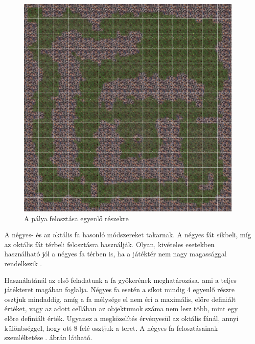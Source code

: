 \begin{figure}[h]
\centering
\includegraphics[scale=0.3]{kepek/grid.png}
\caption{A pálya felosztása egyenlő részekre}
\label{fig:grid}
\end{figure}


A négyes- és az oktális fa hasonló módszereket takarnak. A négyes fát síkbeli, míg az oktális fát térbeli felosztásra használják. Olyan, kivételes esetekben használható jól a négyes fa térben is, ha a játéktér nem nagy magassággal rendelkezik \cite{quadtree}.

Használatánál az első feladatunk a fa gyökerének meghatározása, ami a teljes játékteret magában foglalja. Négyes fa esetén a síkot mindig 4 egyenlő részre osztjuk mindaddig, amíg a fa mélysége el nem éri a maximális, előre definiált értéket, vagy az adott cellában az objektumok száma nem lesz több, mint egy előre definiált érték. Ugyanez a megközelítés érvényesül az oktális fánál, annyi különbséggel, hogy ott 8 felé osztjuk a teret. A négyes fa felosztásainak szemléltetése . ábrán látható.

